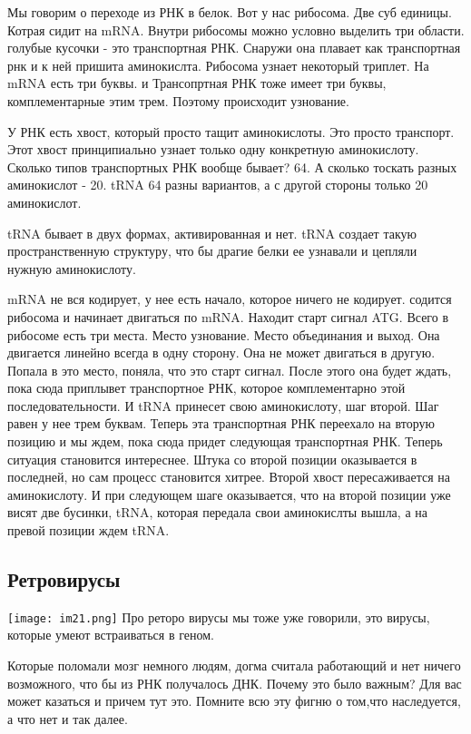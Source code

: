 Мы говорим о переходе из РНК в белок. Вот у нас рибосома. Две суб единицы.
Котрая сидит на mRNA. Внутри рибосомы можно условно выделить
три области. голубые кусочки - это транспортная РНК. Снаружи она плавает
как транспортная рнк и к ней пришита аминокислта. Рибосома узнает
некоторый триплет. На mRNA есть три буквы. и Трансопртная РНК тоже имеет
три буквы, комплементарные этим трем. Поэтому происходит узнование.

У РНК есть хвост, который просто тащит аминокислоты. Это просто транспорт. Этот
хвост принципиально узнает только одну конкретную аминокислоту. Сколько типов
транспортных РНК вообще бывает? 64. А сколько тоскать разных аминокислот - 20.
tRNA 64 разны вариантов, а с другой стороны только 20 аминокислот.

tRNA бывает в двух формах, активированная и нет. tRNA создает такую пространственную
структуру, что бы драгие белки ее узнавали и цепляли нужную аминокислоту.

mRNA не вся кодирует, у нее есть начало, которое ничего не кодирует. содится рибосома и
начинает двигаться по mRNA. Находит старт сигнал ATG. Всего в рибосоме есть три места.
Место узнование. Место объединания и выход. Она двигается линейно всегда в одну сторону.
Она не может двигаться в другую. Попала в это место, поняла, что 
это старт сигнал. После этого она будет ждать, пока 
сюда приплывет транспортное РНК, которое комплементарно этой последовательности. 
И tRNA принесет свою аминокислоту, шаг второй. Шаг равен у нее трем буквам. Теперь эта 
транспортная РНК переехало на вторую позицию и мы ждем, пока сюда придет следующая 
транспортная РНК. Теперь ситуация становится интереснее. Штука со второй позиции оказывается 
в последней, но сам процесс становится хитрее. Второй хвост пересаживается на аминокислоту. 
И при следующем шаге оказывается, что на второй позиции уже висят две бусинки, tRNA, которая 
передала свои аминокислты вышла, а на превой позиции ждем tRNA.

\subsection{Ретровирусы}
\texttt{[image: im21.png]}
Про реторо вирусы мы тоже уже говорили, это вирусы, которые 
умеют встраиваться в геном. 

Которые поломали мозг немного людям, догма считала работающий и 
нет ничего возможного, что бы из РНК получалось ДНК. 
Почему это было важным? Для вас может казаться и причем тут это. 
Помните всю эту фигню о том,что наследуется, а что нет и так далее. 

